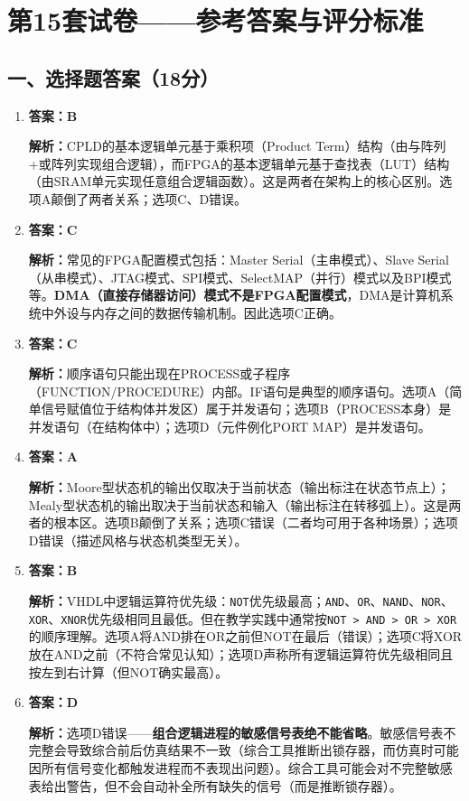 \chapter{第15套试卷——参考答案与评分标准}

\section{一、选择题答案（18分）}

\begin{enumerate}[label=\arabic*.]

\item \textbf{答案：B}

\textbf{解析：}CPLD的基本逻辑单元基于乘积项（Product Term）结构（由与阵列+或阵列实现组合逻辑），而FPGA的基本逻辑单元基于查找表（LUT）结构（由SRAM单元实现任意组合逻辑函数）。这是两者在架构上的核心区别。选项A颠倒了两者关系；选项C、D错误。

\item \textbf{答案：C}

\textbf{解析：}常见的FPGA配置模式包括：Master Serial（主串模式）、Slave Serial（从串模式）、JTAG模式、SPI模式、SelectMAP（并行）模式以及BPI模式等。\textbf{DMA（直接存储器访问）模式不是FPGA配置模式}，DMA是计算机系统中外设与内存之间的数据传输机制。因此选项C正确。

\item \textbf{答案：C}

\textbf{解析：}顺序语句只能出现在PROCESS或子程序（FUNCTION/PROCEDURE）内部。IF语句是典型的顺序语句。选项A（简单信号赋值位于结构体并发区）属于并发语句；选项B（PROCESS本身）是并发语句（在结构体中）；选项D（元件例化PORT MAP）是并发语句。

\item \textbf{答案：A}

\textbf{解析：}Moore型状态机的输出仅取决于当前状态（输出标注在状态节点上）；Mealy型状态机的输出取决于当前状态和输入（输出标注在转移弧上）。这是两者的根本区。选项B颠倒了关系；选项C错误（二者均可用于各种场景）；选项D错误（描述风格与状态机类型无关）。

\item \textbf{答案：B}

\textbf{解析：}VHDL中逻辑运算符优先级：\texttt{NOT}优先级最高；\texttt{AND}、\texttt{OR}、\texttt{NAND}、\texttt{NOR}、\texttt{XOR}、\texttt{XNOR}优先级相同且最低。但在教学实践中通常按\texttt{NOT > AND > OR > XOR}的顺序理解。选项A将AND排在OR之前但NOT在最后（错误）；选项C将XOR放在AND之前（不符合常见认知）；选项D声称所有逻辑运算符优先级相同且按左到右计算（但NOT确实最高）。

\item \textbf{答案：D}

\textbf{解析：}选项D错误——\textbf{组合逻辑进程的敏感信号表绝不能省略}。敏感信号表不完整会导致综合前后仿真结果不一致（综合工具推断出锁存器，而仿真时可能因所有信号变化都触发进程而不表现出问题）。综合工具可能会对不完整敏感表给出警告，但不会自动补全所有缺失的信号（而是推断锁存器）。

\end{enumerate}


